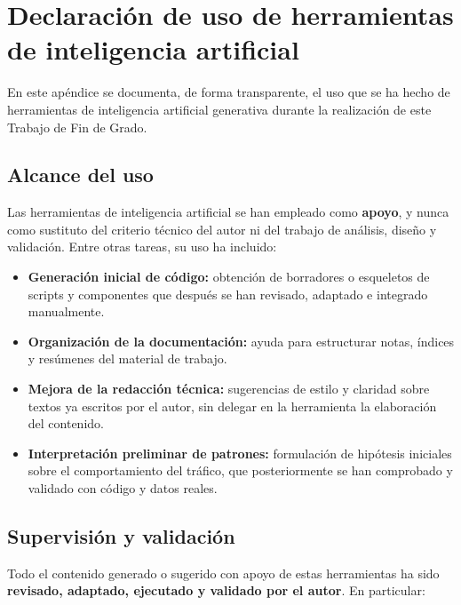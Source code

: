 \chapter{Declaración de uso de herramientas de inteligencia artificial}
\label{ap:declaracion-ia}

En este apéndice se documenta, de forma transparente, el uso que se ha hecho de herramientas de inteligencia artificial generativa durante la realización de este Trabajo de Fin de Grado.

\section{Alcance del uso}
\label{sec:ia_alcance}

Las herramientas de inteligencia artificial se han empleado como \textbf{apoyo}, y nunca como sustituto del criterio técnico del autor ni del trabajo de análisis, diseño y validación. Entre otras tareas, su uso ha incluido:

\begin{itemize}
  \item \textbf{Generación inicial de código:} obtención de borradores o esqueletos de scripts y componentes que después se han revisado, adaptado e integrado manualmente.
  \item \textbf{Organización de la documentación:} ayuda para estructurar notas, índices y resúmenes del material de trabajo.
  \item \textbf{Mejora de la redacción técnica:} sugerencias de estilo y claridad sobre textos ya escritos por el autor, sin delegar en la herramienta la elaboración del contenido.
  \item \textbf{Interpretación preliminar de patrones:} formulación de hipótesis iniciales sobre el comportamiento del tráfico, que posteriormente se han comprobado y validado con código y datos reales.
\end{itemize}

\section{Supervisión y validación}
\label{sec:ia_supervision}

Todo el contenido generado o sugerido con apoyo de estas herramientas ha sido \textbf{revisado, adaptado, ejecutado y validado por el autor}. En particular:

